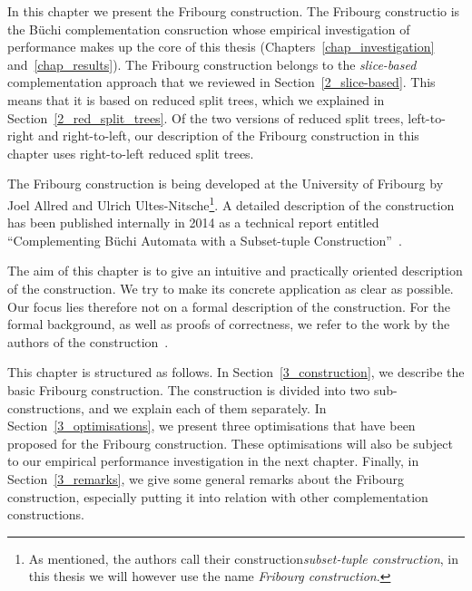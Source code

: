 In this chapter we present the Fribourg construction. The Fribourg constructio  is the Büchi complementation consruction whose empirical investigation of performance makes up the core of this thesis (Chapters~\ref{chap_investigation} and~\ref{chap_results}). The Fribourg construction belongs to the \textit{slice-based} complementation approach that we reviewed in Section~\ref{2_slice-based}. This means that it is based on reduced split trees, which we explained in Section~\ref{2_red_split_trees}. Of the two versions of reduced split trees, left-to-right and right-to-left, our description of the Fribourg construction in this chapter uses right-to-left reduced split trees.

The Fribourg construction is being developed at the University of Fribourg by Joel Allred and Ulrich Ultes-Nitsche\footnote{As mentioned, the authors call their construction\textit{subset-tuple construction}, in this thesis we will however use the name \textit{Fribourg construction}.}. A detailed description of the construction has been published internally in 2014 as a technical report entitled ``Complementing Büchi Automata with a Subset-tuple Construction''~\cite{2014_joel_ulrich}.

The aim of this chapter is to give an intuitive and practically oriented description of the construction. We try to make its concrete application as clear as possible. Our focus lies therefore not on a formal description of the construction. For the formal background, as well as proofs of correctness, we refer to the work by the authors of the construction~\cite{2014_joel_ulrich}.

This chapter is structured as follows. In Section~\ref{3_construction}, we describe the basic Fribourg construction. The construction is divided into two sub-constructions, and we explain each of them separately. In Section~\ref{3_optimisations}, we present three optimisations that have been proposed for the Fribourg construction. These optimisations will also be subject to our empirical performance investigation in the next chapter. Finally, in Section~\ref{3_remarks}, we give some general remarks about the Fribourg construction, especially putting it into relation with other complementation constructions.




